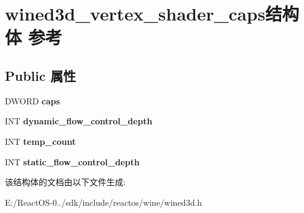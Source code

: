 \hypertarget{structwined3d__vertex__shader__caps}{}\section{wined3d\+\_\+vertex\+\_\+shader\+\_\+caps结构体 参考}
\label{structwined3d__vertex__shader__caps}
\subsection*{Public 属性}
\begin{DoxyCompactItemize}
\item 
\mbox{\label{structwined3d__vertex__shader__caps_aa9bef99140cc4a4b5254c817c9460612}} 
D\+W\+O\+RD {\bfseries caps}
\item 
\mbox{\label{structwined3d__vertex__shader__caps_ad00164ab69d84401923c7194c2a5107f}} 
I\+NT {\bfseries dynamic\+\_\+flow\+\_\+control\+\_\+depth}
\item 
\mbox{\label{structwined3d__vertex__shader__caps_a90dc5543d4b8e28ba1c22b16c7c6c75d}} 
I\+NT {\bfseries temp\+\_\+count}
\item 
\mbox{\label{structwined3d__vertex__shader__caps_a4958adc3e1809573929dcd8cae3573e1}} 
I\+NT {\bfseries static\+\_\+flow\+\_\+control\+\_\+depth}
\end{DoxyCompactItemize}


该结构体的文档由以下文件生成\+:\begin{DoxyCompactItemize}
\item 
E\+:/\+React\+O\+S-\/0../sdk/include/reactos/wine/wined3d.\+h\end{DoxyCompactItemize}
